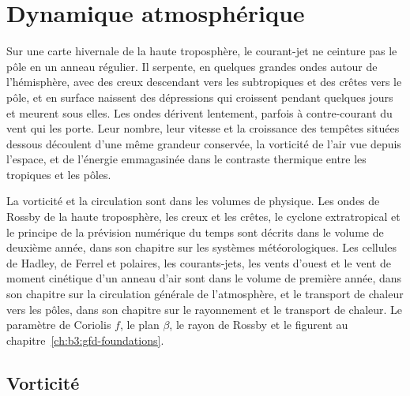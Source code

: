 \chapter{Dynamique atmosphérique}\label{ch:b3:atmospheric-dynamics}

Sur une carte hivernale de la haute troposphère, le courant-jet ne ceinture pas
le pôle en un anneau régulier. Il serpente, en quelques grandes ondes autour de
l'hémisphère, avec des creux descendant vers les subtropiques et des crêtes vers le
pôle, et en surface naissent des dépressions qui croissent pendant quelques jours et meurent
sous elles. Les ondes dérivent lentement, parfois à contre-courant du vent qui
les porte. Leur nombre, leur vitesse et la croissance des tempêtes situées dessous
découlent d'une même grandeur conservée, la vorticité de l'air vue depuis
l'espace, et de l'énergie emmagasinée dans le contraste thermique entre les
tropiques et les pôles.

\begin{recall}
La vorticité et la circulation sont dans les volumes de physique. Les ondes de Rossby de la
haute troposphère, les creux et les crêtes, le cyclone extratropical et le
principe de la prévision numérique du temps sont décrits dans le
volume de deuxième année, dans son chapitre sur les systèmes météorologiques. Les cellules de Hadley, de Ferrel et
polaires, les courants-jets, les vents d'ouest et le vent de moment cinétique d'un anneau
d'air sont dans le volume de première année, dans son chapitre sur la circulation générale de
l'atmosphère, et le transport de chaleur vers les pôles, dans son chapitre sur
le rayonnement et le transport de chaleur. Le paramètre de Coriolis $f$, le plan $\beta$,
le rayon de Rossby et le  figurent au
chapitre~\ref{ch:b3:gfd-foundations}.
\end{recall}

\section{Vorticité}\label{sec:b3:atmospheric-dynamics:vorticity}

